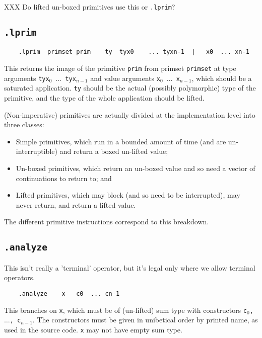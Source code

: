 \documentclass{report}
\newcommand\stringcode[1]{\texttt{#1}}
\begin{document}
XXX Do lifted un-boxed primitives use this or \stringcode{.lprim}?

\subsection{\stringcode{.lprim}}

\begin{verbatim}
	.lprim	primset	prim	ty	tyx0	...	tyxn-1	|	x0	...	xn-1
\end{verbatim}

This returns the image of the primitive \stringcode{prim} from primset \stringcode{primset} at type arguments \stringcode{tyx$_0$ $\ldots$ tyx$_{n-1}$} and value arguments \stringcode{x$_0$ $\ldots$ x$_{n-1}$},
which should be a saturated application.
\stringcode{ty} should be the actual (possibly polymorphic) type of the primitive,
and the type of the whole application should be lifted.

(Non-imperative) primitives are actually divided at the implementation level into three classes:
\begin{itemize}
    \item Simple primitives, which run in a bounded amount of time (and are un-interruptible) and return a boxed un-lifted value;
    \item Un-boxed primitives, which return an un-boxed value and so need a vector of continuations to return to; and
    \item Lifted primitives, which may block (and so need to be interrupted), may never return, and return a lifted value.
\end{itemize}
The different primitive instructions correspond to this breakdown.

\subsection{\stringcode{.analyze}}

This isn't really a 'terminal' operator, but it's legal only where we allow terminal operators.

\begin{verbatim}
	.analyze	x	c0	...	cn-1
\end{verbatim}

This branches on \stringcode{x}, which must be of (un-lifted) sum type with constructors \stringcode{c$_0$, $\ldots$, c$_{n-1}$}.
The constructors must be given in unibetical order by printed name, as used in the source code.
\stringcode{x} may  not have empty sum type.
\end{document}
